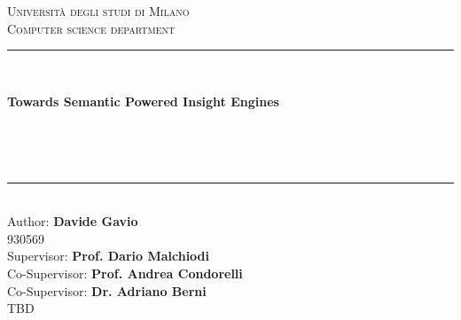 \documentclass[\main/main.tex]{subfiles}
\begin{document}
\pagestyle{empty} %
\begin{titlepage}
	\begin{center}
		\vfill
		{\large \scshape Università degli studi di Milano}\\[0.1cm]
		{\large \scshape Computer science department}\\[0.5cm]
		\rule{\textwidth}{1.5pt}\\[0cm]
		{\huge \bfseries  Towards Semantic Powered Insight Engines \par \ }\\[-0.5cm]
		\rule{\textwidth}{1.5pt}\\[2.5cm]
		{\hfill \large Author: \textbf{Davide Gavio}} \\
		\vspace{0.1cm}
		{\hfill \large 930569} \\
		\vspace{0.5cm}
		{\hfill \large Supervisor: \textbf{Prof. Dario Malchiodi}} \\
	    {\hfill \large Co-Supervisor: \textbf{Prof. Andrea Condorelli} \\}
	    {\hfill \large Co-Supervisor: \textbf{Dr. Adriano Berni} \\}
	    \vspace{1cm}
		\hfill  TBD
	\end{center}
\end{titlepage}
\end{document}
